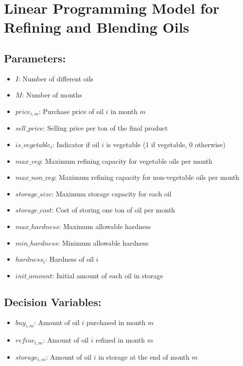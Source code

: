 \documentclass{article}
\begin{document}
\section*{Linear Programming Model for Refining and Blending Oils}

\subsection*{Parameters:}
\begin{itemize}
    \item $I$: Number of different oils
    \item $M$: Number of months
    \item $price_{i,m}$: Purchase price of oil $i$ in month $m$
    \item $sell\_price$: Selling price per ton of the final product
    \item $is\_vegetable_{i}$: Indicator if oil $i$ is vegetable (1 if vegetable, 0 otherwise)
    \item $max\_veg$: Maximum refining capacity for vegetable oils per month
    \item $max\_non\_veg$: Maximum refining capacity for non-vegetable oils per month
    \item $storage\_size$: Maximum storage capacity for each oil
    \item $storage\_cost$: Cost of storing one ton of oil per month
    \item $max\_hardness$: Maximum allowable hardness
    \item $min\_hardness$: Minimum allowable hardness
    \item $hardness_{i}$: Hardness of oil $i$
    \item $init\_amount$: Initial amount of each oil in storage
\end{itemize}

\subsection*{Decision Variables:}
\begin{itemize}
    \item $buy_{i,m}$: Amount of oil $i$ purchased in month $m$
    \item $refine_{i,m}$: Amount of oil $i$ refined in month $m$
    \item $storage_{i,m}$: Amount of oil $i$ in storage at the end of month $m$
\end{itemize}
\end{document}
